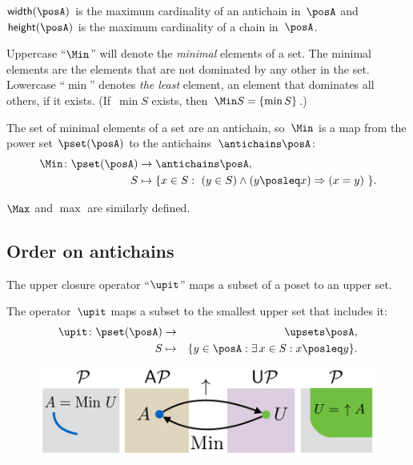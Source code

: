 \begin{definition}
  \label{def:poset-width-height} $\mathsf{width}(\posA)$ is the maximum
  cardinality of an antichain in~$\posA$ and $\mathsf{height}(\posA)$
  is the maximum cardinality of a chain in~$\posA$.
\end{definition}

Uppercase ``$\Min$'' will denote the \emph{minimal} elements of
a set. The minimal elements are the elements that are not dominated
by any other in the set. Lowercase ``$\min$'' denotes\emph{ the
least} element, an element that dominates all others, if it exists.
(If~$\min S$ exists, then~$\Min S=\{\min S\}$.)

The set of minimal elements of a set are an antichain, so~$\Min$
is a map from the power set $\pset(\posA)$ to the antichains~$\antichains\posA$:
\begin{align*}
  \Min\colon\pset(\posA) & \rightarrow\antichains\posA,\\
  S & \mapsto\{x\in S:\ (y\in S)\wedge(y\posleq x)\Rightarrow(x=y)\ \}.
\end{align*}

$\Max$ and $\max$ are similarly defined.

\subsection{Order on antichains}

The upper closure operator ``$\upit$'' maps a subset of a poset
to an upper set.
\begin{definition}
  The operator~$\upit$ maps a subset to the smallest upper set that
  includes it:
  \begin{eqnarray*}
    \upit\colon\pset(\posA) & \rightarrow & \upsets\posA,\\
    S & \mapsto & \{y\in\posA:\exists\,x\in S:x\posleq y\}.
  \end{eqnarray*}
\end{definition}

\begin{figure}[h]
  \begin{center}
    \includegraphics[scale=0.4]{gmcdp_antichains_upsets}
  \end{center}
  \caption{\label{fig:antichains_upsets}}
\end{figure}


